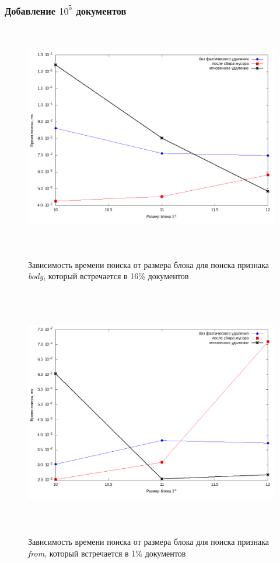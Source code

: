 \subsubsection{Добавление $10^5$ документов}


\begin{figure}[H]
\includegraphics[width=\linewidth, height=10cm]{fig/limit_1/1e5/body.png}
\caption{Зависимость времени поиска от размера блока для поиска признака \textit{body}, который встречается в 16\% документов}
\includegraphics[width=\linewidth, height=11cm]{fig/limit_1/1e5/from.png}
\caption{Зависимость времени поиска от размера блока для поиска признака \textit{from}, который встречается в 1\% документов}
\end{figure}

